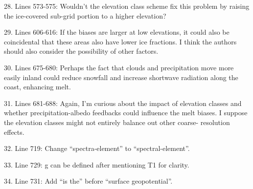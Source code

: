 \documentclass[12pt,oneside,a4paper]{article}%
\begin{document}
28. Lines 573-575: Wouldn’t the elevation class scheme fix this problem by raising the ice-covered sub-grid portion to a higher elevation? \newline

{\color{blue}{That's a good point that we overlooked. We have added a sentence to the end of the next paragraph clarifying that differences between the grid cell mean and actual ice surface are not necessarily problematic due to the EC scheme.}} \newline

29. Lines 606-616: If the biases are larger at low elevations, it could also be coincidental that these areas also have lower ice fractions. I think the authors should also consider the possibility of other factors. \newline

{\color{blue}{We have added a caveat to the conclusions, that our hypothesis needs more testing.}} \newline

30. Lines 675-680: Perhaps the fact that clouds and precipitation move more easily inland could reduce snowfall and increase shortwave radiation along the coast, enhancing melt. \newline

{\color{blue}{See response to general remarks.}} \newline

31. Lines 681-688: Again, I’m curious about the impact of elevation classes and whether precipitation-albedo feedbacks could influence the melt biases. I suppose the elevation classes might not entirely balance out other coarse- resolution effects. \newline

{\color{blue}{See response to general remarks.}} \newline

32. Line 719: Change “spectra-element” to “spectral-element”. \newline

{\color{blue}{Done.}} \newline

33. Line 729: g can be defined after mentioning T1 for clarity. \newline

{\color{blue}{Done.}} \newline

34. Line 731: Add “is the” before “surface geopotential”. \newline
\end{document}
